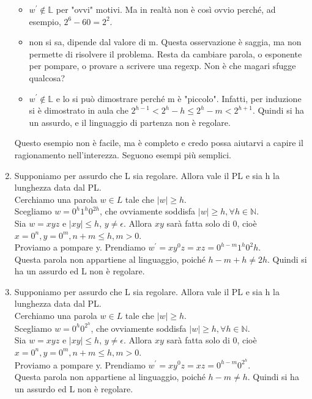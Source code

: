 \documentclass[a4paper,11pt]{article}
\begin{document}
\begin{enumerate}
        \begin{itemize}
            \item $w^{'}\notin \mathbb{L}$ per "ovvi" motivi. Ma in realtà non è così ovvio perché, ad esempio, $2^6-60=2^2$.
            \item non si sa, dipende dal valore di m. Questa osservazione è saggia, ma non permette di risolvere il problema. Resta da cambiare parola, o esponente per pompare, o provare a scrivere una regexp. Non è che magari sfugge qualcosa?
            \item $w^{'}\notin \mathbb{L}$ e lo si può dimostrare perché m è "piccolo". Infatti, per induzione si è dimostrato in aula che $2^{h-1} < 2^h-h \leq 2^h-m < 2^{h+1}$. Quindi si ha un assurdo, e il linguaggio di partenza non è regolare.
        \end{itemize}
        Questo esempio non è facile, ma è completo e credo possa aiutarvi a capire il ragionamento nell'interezza. Seguono esempi più semplici.
        \item Supponiamo per assurdo che L sia regolare. Allora vale il PL e sia h la lunghezza data dal PL.\\
        Cerchiamo una parola $w\in L$ tale che $|w|\geq h$.\\
        Scegliamo $w=0^h1^h0^{2h}$, che ovviamente soddisfa $|w|\geq h, \forall h \in \mathbb{N}$.\\
        Sia $w=xyz$ e $|xy|\leq h$, $y\neq\epsilon$. Allora $xy$ sarà fatta solo di $0$, cioè $x=0^n, y=0^m, n+m\leq h, m>0$.\\
        Proviamo a pompare y. Prendiamo $w^{'}=xy^0z=xz=0^{h-m}1^h0^2h$.\\Questa parola non appartiene al linguaggio, poiché $h-m+h\neq 2h$. Quindi si ha un assurdo ed L non è regolare.
        \item Supponiamo per assurdo che L sia regolare. Allora vale il PL e sia h la lunghezza data dal PL.\\
        Cerchiamo una parola $w\in L$ tale che $|w|\geq h$.\\
        Scegliamo $w=0^h0^{2^h}$, che ovviamente soddisfa $|w|\geq h, \forall h \in \mathbb{N}$.\\
        Sia $w=xyz$ e $|xy|\leq h$, $y\neq\epsilon$. Allora $xy$ sarà fatta solo di $0$, cioè $x=0^n, y=0^m, n+m\leq h, m>0$.\\
        Proviamo a pompare y. Prendiamo $w^{'}=xy^0z=xz=0^{h-m}0^{2^h}$.\\Questa parola non appartiene al linguaggio, poiché $h-m\neq h$. Quindi si ha un assurdo ed L non è regolare.

\end{enumerate}
\end{document}
